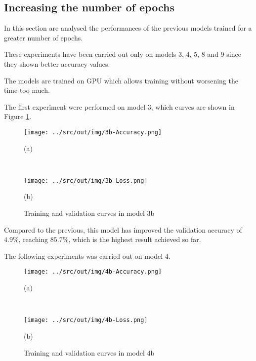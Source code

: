 \documentclass[a4paper,12pt]{article} %
\begin{document}
	\subsection{Increasing the number of epochs}
	\label{subsection:epochs}
	In this section are analysed the performances of the previous models 
	trained for a greater number of epochs. 
	
	These experiments have been carried out only on models 3, 4, 5, 8 and 9 
	since they shown better accuracy values. 
	
	The models are trained on GPU which allows training without worsening the 
	time too much.
	\newline
	
	The first experiment were performed on model 3, which curves are shown in 
	Figure \ref{fig:model3b-performance}. 
		
	\begin{figure}[htb]
		\begin{minipage}[c]{.49\textwidth}
			\centering
			\texttt{[image: ../src/out/img/3b-Accuracy.png]}
			\caption*{(a)}
		\end{minipage}
		~
		\begin{minipage}[c]{.49\textwidth}
			\centering
			\texttt{[image: ../src/out/img/3b-Loss.png]}
			\caption*{(b)}
		\end{minipage}
		\caption{Training and validation curves in model 3b}
		\label{fig:model3b-performance}
	\end{figure}

 	Compared to the previous, this model has improved the validation accuracy 
 	of $4.9\%$, reaching $85.7\%$, which is the highest result achieved so far.
	\newline
	
	The following experiments was carried out on model 4. 
		
	\begin{figure}[H]
		\begin{minipage}[c]{.49\textwidth}
			\centering
			\texttt{[image: ../src/out/img/4b-Accuracy.png]}
			\caption*{(a)}
		\end{minipage}
		~
		\begin{minipage}[c]{.49\textwidth}
			\centering
			\texttt{[image: ../src/out/img/4b-Loss.png]}
			\caption*{(b)}
		\end{minipage}
		\caption{Training and validation curves in model 4b}
		\label{fig:model4b-performance}
	\end{figure}
\end{document}
